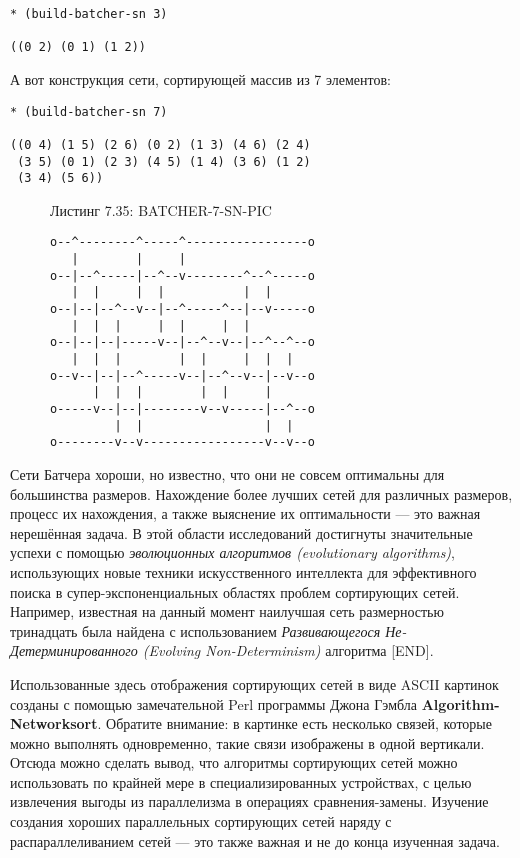 \begin{verbatim}
* (build-batcher-sn 3)
  
((0 2) (0 1) (1 2))
\end{verbatim}

А вот конструкция сети, сортирующей массив из 7 элементов:

\begin{verbatim}
* (build-batcher-sn 7)

((0 4) (1 5) (2 6) (0 2) (1 3) (4 6) (2 4)
 (3 5) (0 1) (2 3) (4 5) (1 4) (3 6) (1 2)
 (3 4) (5 6)) 
\end{verbatim}

\begin{figure}Листинг 7.35: BATCHER-7-SN-PIC\label{listing_7.35}
\listbegin
\begin{verbatim}
o--^--------^-----^-----------------o
   |        |     |
o--|--^-----|--^--v--------^--^-----o
   |  |     |  |           |  |
o--|--|--^--v--|--^-----^--|--v-----o
   |  |  |     |  |     |  |
o--|--|--|-----v--|--^--v--|--^--^--o
   |  |  |        |  |     |  |  |
o--v--|--|--^-----v--|--^--v--|--v--o
      |  |  |        |  |     |
o-----v--|--|--------v--v-----|--^--o
         |  |                 |  |
o--------v--v-----------------v--v--o 
\end{verbatim}
\listend
\end{figure}

Сети Батчера хороши, но известно, что они не совсем оптимальны для большинства размеров. Нахождение более лучших сетей для различных размеров, процесс их нахождения, а также выяснение их оптимальности --- это важная нерешённая задача. В этой области исследований достигнуты значительные успехи с помощью \emph{эволюционных алгоритмов (evolutionary algorithms)}, использующих новые техники искусственного интеллекта для эффективного поиска в супер-экспоненциальных областях проблем сортирующих сетей. Например, известная на данный момент наилучшая сеть размерностью тринадцать была найдена с использованием \emph{Развивающегося Не-Детерминированного (Evolving Non-Determinism)} алгоритма [END].

Использованные здесь отображения сортирующих сетей в виде ASCII картинок созданы с помощью замечательной Perl программы Джона Гэмбла \textbf{Algorithm-Networksort}. Обратите внимание: в картинке есть несколько связей, которые можно выполнять одновременно, такие связи изображены в одной вертикали. Отсюда можно сделать вывод, что алгоритмы сортирующих сетей можно использовать по крайней мере в специализированных устройствах, с целью извлечения выгоды из параллелизма в операциях сравнения-замены. Изучение создания хороших параллельных сортирующих сетей наряду с распараллеливанием сетей --- это также важная и не до конца изученная задача.

